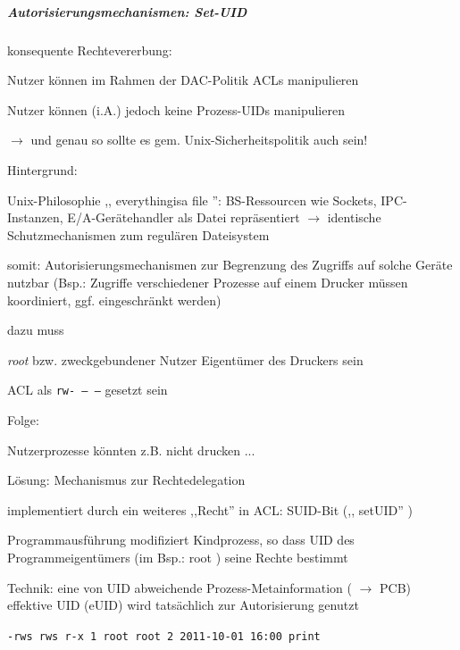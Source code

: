 \documentclass[a4paper]{article}
\begin{document}
\begin{multicols}{3}
    \subparagraph{Autorisierungsmechanismen:
        Set-UID}

    konsequente Rechtevererbung:

    \begin{itemize*}
        \item
        Nutzer können im Rahmen der DAC-Politik ACLs manipulieren
        \item
        Nutzer können (i.A.) jedoch keine Prozess-UIDs manipulieren
        \item
        $\rightarrow$ und genau so sollte es gem.
        Unix-Sicherheitspolitik auch sein!
    \end{itemize*}

    Hintergrund:

    \begin{itemize*}
        \item
        Unix-Philosophie ,, everythingisa file '': BS-Ressourcen wie Sockets,
        IPC-Instanzen, E/A-Gerätehandler als Datei repräsentiert
        $\rightarrow$ identische Schutzmechanismen zum
        regulären Dateisystem
        \item
        somit: Autorisierungsmechanismen zur Begrenzung des Zugriffs auf
        solche Geräte nutzbar (Bsp.: Zugriffe verschiedener Prozesse auf einem
        Drucker müssen koordiniert, ggf. eingeschränkt werden)
        \item
        dazu muss
        \begin{itemize*}
            \item \emph{root} bzw. zweckgebundener Nutzer Eigentümer des Druckers sein
            \item ACL als \texttt{rw-\ ---\ ---} gesetzt sein
        \end{itemize*}
    \end{itemize*}

    Folge:

    \begin{itemize*}
        \item
        Nutzerprozesse könnten z.B. nicht drucken ...
    \end{itemize*}

    Lösung: Mechanismus zur Rechtedelegation

    \begin{itemize*}
        \item
        implementiert durch ein weiteres ,,Recht'' in ACL: SUID-Bit (,,
        setUID'' )
        \item
        Programmausführung modifiziert Kindprozess, so dass UID des
        Programmeigentümers (im Bsp.: root ) seine Rechte bestimmt
        \item
        Technik: eine von UID abweichende Prozess-Metainformation
        ( $\rightarrow$ PCB) effektive UID (eUID) wird
        tatsächlich zur Autorisierung genutzt
        \item
        \texttt{-rws\ rws\ r-x\ 1\ root\ root\ 2\ 2011-10-01\ 16:00\ print}
    \end{itemize*}


\end{multicols}
\end{document}
